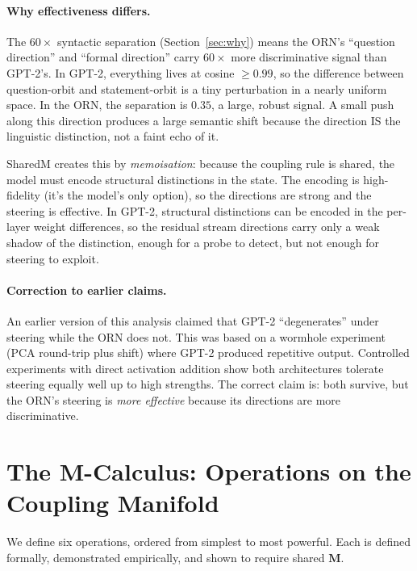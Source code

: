 \documentclass[11pt, a4paper]{article}
\newcommand{\M}{\mathbf{M}}
\theoremstyle{plain}
\theoremstyle{definition}
\theoremstyle{remark}
\begin{document}
\paragraph{Why effectiveness differs.}
The $60\times$ syntactic separation (Section~\ref{sec:why}) means the ORN's ``question direction'' and ``formal direction'' carry $60\times$ more discriminative signal than GPT-2's.
In GPT-2, everything lives at cosine $\geq 0.99$, so the difference between question-orbit and statement-orbit is a tiny perturbation in a nearly uniform space.
In the ORN, the separation is $0.35$, a large, robust signal.
A small push along this direction produces a large semantic shift because the direction IS the linguistic distinction, not a faint echo of it.

SharedM creates this by \emph{memoisation}: because the coupling rule is shared, the model must encode structural distinctions in the state.
The encoding is high-fidelity (it's the model's only option), so the directions are strong and the steering is effective.
In GPT-2, structural distinctions can be encoded in the per-layer weight differences, so the residual stream directions carry only a weak shadow of the distinction, enough for a probe to detect, but not enough for steering to exploit.

\paragraph{Correction to earlier claims.}
An earlier version of this analysis claimed that GPT-2 ``degenerates'' under steering while the ORN does not.
This was based on a wormhole experiment (PCA round-trip plus shift) where GPT-2 produced repetitive output.
Controlled experiments with direct activation addition show both architectures tolerate steering equally well up to high strengths.
The correct claim is: both survive, but the ORN's steering is \emph{more effective} because its directions are more discriminative.

\section{The M-Calculus: Operations on the Coupling Manifold}
\label{sec:operations}

We define six operations, ordered from simplest to most powerful.
Each is defined formally, demonstrated empirically, and shown to require shared $\M$.
\end{document}
